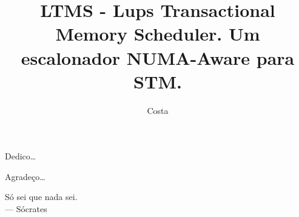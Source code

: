 \documentclass[diss,capa]{texufpel}
\title{LTMS - Lups Transactional Memory Scheduler. Um escalonador NUMA-Aware para STM.}
\author{Costa}{Michael Alexandre}
\begin{document}

\maketitle 

\sloppy

\fichacatalografica





\begin{dedicatoria}
  Dedico\ldots 
\end{dedicatoria}

\begin{agradecimentos}
  Agradeço\ldots 
\end{agradecimentos}

\begin{epigrafe}
  Só sei que nada sei.\\
  {\sc --- Sócrates}
\end{epigrafe}
\end{document}
